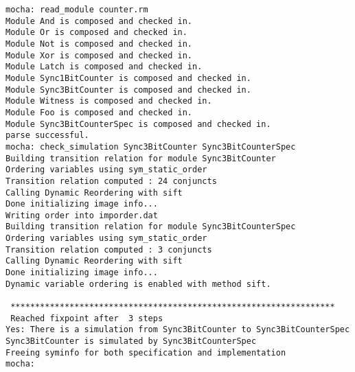 \mypar
\begin{verbatim}
mocha: read_module counter.rm
Module And is composed and checked in.
Module Or is composed and checked in.
Module Not is composed and checked in.
Module Xor is composed and checked in.
Module Latch is composed and checked in.
Module Sync1BitCounter is composed and checked in.
Module Sync3BitCounter is composed and checked in.
Module Witness is composed and checked in.
Module Foo is composed and checked in.
Module Sync3BitCounterSpec is composed and checked in.
parse successful.
mocha: check_simulation Sync3BitCounter Sync3BitCounterSpec
Building transition relation for module Sync3BitCounter
Ordering variables using sym_static_order
Transition relation computed : 24 conjuncts
Calling Dynamic Reordering with sift
Done initializing image info...
Writing order into imporder.dat
Building transition relation for module Sync3BitCounterSpec
Ordering variables using sym_static_order
Transition relation computed : 3 conjuncts
Calling Dynamic Reordering with sift
Done initializing image info...
Dynamic variable ordering is enabled with method sift.
 
 ****************************************************************** 
 Reached fixpoint after  3 steps
Yes: There is a simulation from Sync3BitCounter to Sync3BitCounterSpec
Sync3BitCounter is simulated by Sync3BitCounterSpec
Freeing syminfo for both specification and implementation
mocha: 
\end{verbatim}


